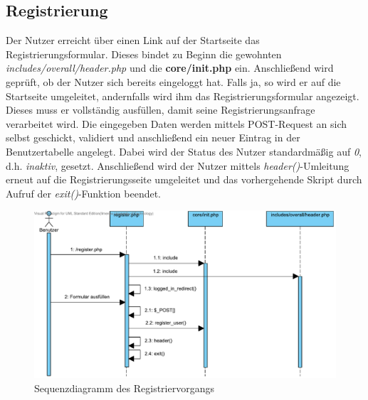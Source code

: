 \documentclass[fontsize = 12pt, paper = a4]{scrreprt}
\begin{document}
\newpage
\subsection{Registrierung}
Der Nutzer erreicht über einen Link auf der Startseite das Registrierungsformular. Dieses bindet zu Beginn die gewohnten \textit{includes/overall/header.php} und die \textbf{core/init.php} ein. Anschließend wird geprüft, ob der Nutzer sich bereits eingeloggt hat. Falls ja, so wird er auf die Startseite umgeleitet, andernfalls wird ihm das Registrierungsformular angezeigt. Dieses muss er vollständig ausfüllen, damit seine Registrierungsanfrage verarbeitet wird. Die eingegeben Daten werden mittels POST-Request an sich selbst geschickt, validiert und anschließend ein neuer Eintrag in der Benutzertabelle angelegt. Dabei wird der Status des Nutzer standardmäßig auf \textit{0}, d.h. \textit{inaktiv}, gesetzt. Anschließend wird der Nutzer mittels \textit{header()}-Umleitung erneut auf die Registrierungsseite umgeleitet und das vorhergehende Skript durch Aufruf der \textit{exit()}-Funktion beendet.

\begin{figure}[h]
\centering
\includegraphics[scale = 0.75]{registrierung}
\caption[Sequenzdiagramm des Registriervorgangs]{Sequenzdiagramm des Registriervorgangs}
\label{registrierung}
\end{figure}

\newpage
\end{document}
